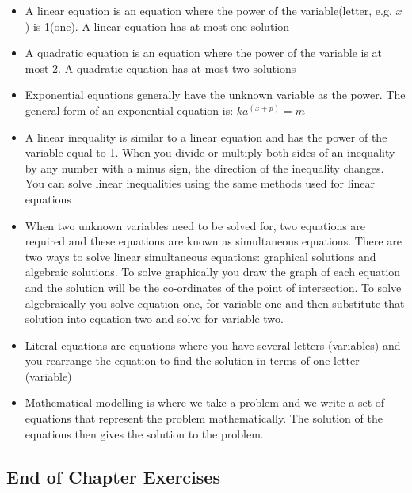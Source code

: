 \label{m39263*eip-909}\begin{itemize}[noitemsep]
            \item A linear equation is an
equation where the power of the variable(letter, e.g. \begin{math}x\end{math}) is 1(one). A linear equation has at most one solution\item A quadratic equation is an equation where the power of the variable is at most 2. A quadratic equation has at most two solutions\item Exponential equations generally have the unknown variable as the power. The general form of an exponential equation is: 
	\begin{math}k{a}^{\left(x+p\right)}=m\end{math}\item A linear inequality is similar to a linear equation and has the power of the variable equal to 1.
	When you divide or multiply both sides of an inequality by any number with a minus sign, the direction of the inequality changes. You can solve linear inequalities using the same methods used for linear equations\item When two unknown variables need to be solved for, two equations are required and these equations are known as simultaneous equations. There are two ways to solve linear simultaneous equations: graphical solutions and algebraic solutions. To solve graphically you draw the graph of each equation and the solution will be the co-ordinates of the point of intersection. To solve algebraically you solve equation one, for variable one and then substitute that solution into equation two and solve for variable two.\item Literal equations are equations where you have several letters (variables) and you rearrange the equation to find the solution in terms of one letter (variable)\item Mathematical modelling is where we take a problem and we write a set of equations that represent the problem mathematically. The solution of the equations then gives the solution to the problem.\end{itemize}
        \label{m39263*uid119}
            \subsection{ End of Chapter Exercises}
            \nopagebreak
            
